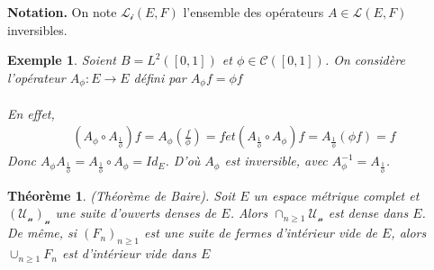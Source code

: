 \documentclass{report}
\newtheorem{Ex}{Exemple}[subsection]
\newtheorem{The}{Théorème}[subsection]
\begin{document}
{\textbf{Notation.} On note $\mathscr{L_i}(E, F)$ l'ensemble des opérateurs $A \in \mathscr{L}(E, F)$ inversibles.




\begin{Ex}Soient $B = L^{2}([0, 1])$ et $\phi \in \mathscr{C}([0, 1])$. On considère l'opérateur $A_\phi : E \to E$ défini par $A_{\phi} f = \phi f$		\\
 \\
En effet, 	
			\begin{align*}
			(A_\phi \circ A_{\frac{1}{\phi}})f = A_{\phi}(\frac{f}{\phi}) = f et (A_{\frac{1}{\phi}} \circ A_{\phi})f = A_{\frac{1}{\phi}}(\phi f) = f
			\end{align*}
Donc $A_{\phi}A_{\frac{1}{\phi}} = A_{\frac{1}{\phi}} \circ A_\phi = Id_E$. D'où $A_\phi$ est inversible, avec $A_\phi^{-1} = A_{\frac{1}{\phi}}$.
\end{Ex}




\begin{The}(Théorème de Baire). Soit $E$ un espace métrique complet et $\mathscr{(U_n)_n}$ une suite d'ouverts denses de 
$E$. Alors $\cap_{n \ge 1} \mathscr{U_n}$ est dense dans $E$.		\\
De même, si $(F_n)_{n \ge 1}$ est une suite de fermes d'intérieur vide de $E$, alors $\cup_{n \ge 1} F_n$ est d'intérieur vide dans $E$
\end{The}


}
\end{document}
